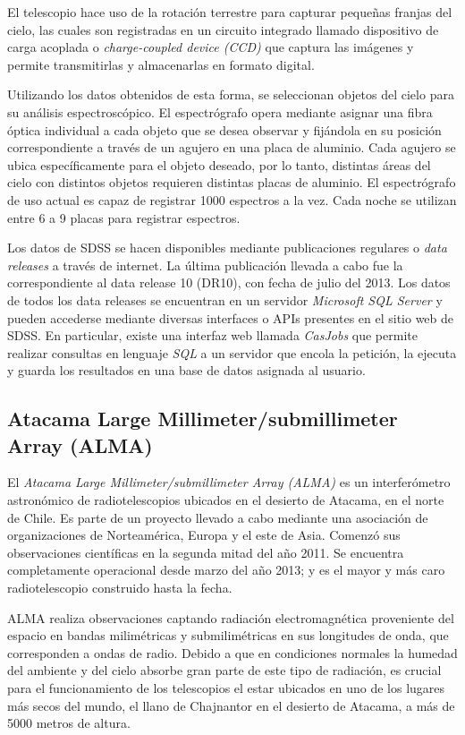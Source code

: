 El telescopio hace uso de la rotación terrestre para capturar pequeñas franjas del cielo, las cuales son registradas en un circuito integrado llamado dispositivo de carga acoplada o \textit{charge-coupled device (CCD)} que captura las imágenes y permite transmitirlas y almacenarlas en formato digital.

Utilizando los datos obtenidos de esta forma, se seleccionan objetos del cielo para su análisis espectroscópico. El espectrógrafo opera mediante asignar una fibra óptica individual a cada objeto que se desea observar y fijándola en su posición correspondiente a través de un agujero en una placa de aluminio. Cada agujero se ubica específicamente para el objeto deseado, por lo tanto, distintas áreas del cielo con distintos objetos requieren distintas placas de aluminio. El espectrógrafo de uso actual es capaz de registrar 1000 espectros a la vez. Cada noche se utilizan entre 6 a 9 placas para registrar espectros.

Los datos de SDSS se hacen disponibles mediante publicaciones regulares o \textit{data releases} a través de internet. La última publicación llevada a cabo fue la correspondiente al data release 10 (DR10), con fecha de julio del 2013. Los datos de todos los data releases se encuentran en un servidor \textit{Microsoft SQL Server} y pueden accederse mediante diversas interfaces o APIs presentes en el sitio web de SDSS. En particular, existe una interfaz web llamada \textit{CasJobs} que permite realizar consultas en lenguaje \textit{SQL} a un servidor que encola la petición, la ejecuta y guarda los resultados en una base de datos asignada al usuario.

\subsection{Atacama Large Millimeter/submillimeter Array (ALMA)}

El \textit{Atacama Large Millimeter/submillimeter Array (ALMA)} es un interferómetro astronómico de radiotelescopios ubicados en el desierto de Atacama, en el norte de Chile. Es parte de un proyecto llevado a cabo mediante una asociación de organizaciones de Norteamérica, Europa y el este de Asia. Comenzó sus observaciones científicas en la segunda mitad del año 2011. Se encuentra completamente operacional desde marzo del año 2013; y es el mayor y más caro radiotelescopio construido hasta la fecha.

ALMA realiza observaciones captando radiación electromagnética proveniente del espacio en bandas milimétricas y submilimétricas en sus longitudes de onda, que corresponden a ondas de radio. Debido a que en condiciones normales la humedad del ambiente y del cielo absorbe gran parte de este tipo de radiación, es crucial para el funcionamiento de los telescopios el estar ubicados en uno de los lugares más secos del mundo, el llano de Chajnantor en el desierto de Atacama, a más de 5000 metros de altura. 

